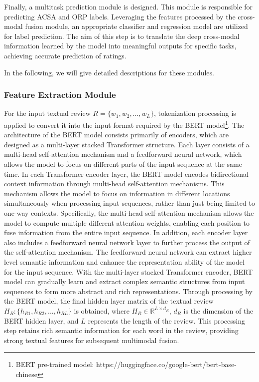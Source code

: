 \documentclass[preprint,12pt]{elsarticle}
\begin{document}
Finally, a multitask prediction module is designed. This module is responsible for predicting ACSA and ORP labels. Leveraging the features processed by the cross-modal fusion module, an appropriate classifier and regression model are utilized for label prediction. The aim of this step is to translate the deep cross-modal information learned by the model into meaningful outputs for specific tasks, achieving accurate prediction of ratings. 

In the following, we will give detailed descriptions for these modules.

\subsubsection {Feature Extraction Module}

For the input textual review \( R = \{w_1, w_2, ..., w_L\} \), tokenization processing is applied to convert it into the input format required by the BERT model\footnote{BERT pre-trained model: https://huggingface.co/google-bert/bert-base-chinese}. The architecture of the BERT model consists primarily of encoders, which are designed as a multi-layer stacked Transformer structure. Each layer consists of a multi-head self-attention mechanism and a feedforward neural network, which allows the model to focus on different parts of the input sequence at the same time. In each Transformer encoder layer, the BERT model encodes bidirectional context information through multi-head self-attention mechanisms. This mechanism allows the model to focus on information in different locations simultaneously when processing input sequences, rather than just being limited to one-way contexts. Specifically, the multi-head self-attention mechanism allows the model to compute multiple different attention weights, enabling each position to fuse information from the entire input sequence. In addition, each encoder layer also includes a feedforward neural network layer to further process the output of the self-attention mechanism. The feedforward neural network can extract higher level semantic information and enhance the representation ability of the model for the input sequence. With the multi-layer stacked Transformer encoder, BERT model can gradually learn and extract complex semantic structures from input sequences to form more abstract and rich representations. Through processing by the BERT model, the final hidden layer matrix of the textual review \( H_R: \{h_{R1}, h_{R2}, ..., h_{RL}\} \) is obtained, where \( H_R \in \mathbb{R}^{L \times d_R} \), \( d_R \) is the dimension of the BERT hidden layer, and \( L \) represents the length of the review. This processing step retains rich semantic information for each word in the review, providing strong textual features for subsequent multimodal fusion.
\end{document}
